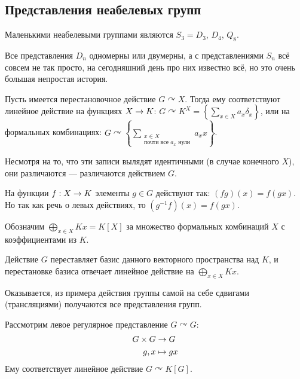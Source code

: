 \subsection{Представления неабелевых групп}
Маленькими неабелевыми группами являются $S_3 = D_3$, $D_4$, $Q_8$.

Все представления $D_n$ одномерны или двумерны, а с представлениями $S_n$ всё совсем не так просто, на сегодняшний день про них известно всё, но это очень большая непростая история.

Пусть имеется перестановочное действие $G \curvearrowright X$.
Тогда ему соответствуют линейное действие на функциях $X \rightarrow K$: $G \curvearrowright K^X = \left\{\sum\limits_{x \in X}a_x \delta_x\right\}$, или на формальных комбинациях: $G \curvearrowright \left\{\sum\limits_{\substack{x \in X\\\text{почти все $a_x$ нули}}}a_x x\right\}$.

Несмотря на то, что эти записи вылядят идентичными (в случае конечного $X$), они различаются --- различаются действием $G$.

На функции $f: X \rightarrow K$ элементы $g \in G$ действуют так: $(fg)(x) = f(gx)$.
Но так как речь о левых действиях, то $(g^{-1}f)(x) = f(gx)$.

Обозначим $\bigoplus\limits_{x \in X}Kx = K[X]$ за множество формальных комбинаций $X$ с коэффициентами из $K$.

Действие $G$ переставляет базис данного векторного пространства над $K$, и перестановке базиса отвечает линейное действие на $\bigoplus\limits_{x \in X}Kx$.

Оказывается, из примера действия группы самой на себе сдвигами (трансляциями) получаются все представления групп.

Рассмотрим левое регулярное представление $G \curvearrowright G$:
\begin{align*}
    G \times G &\rightarrow G \\ g,x &\mapsto gx
\end{align*}
Ему соответствует линейное действие $G \curvearrowright K[G]$.

